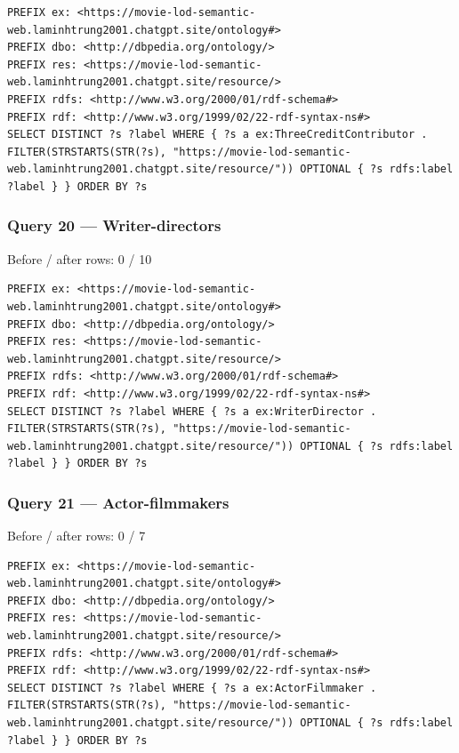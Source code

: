 \documentclass[
  11pt,
]{article}
\begin{document}
\begin{verbatim}
PREFIX ex: <https://movie-lod-semantic-web.laminhtrung2001.chatgpt.site/ontology#>
PREFIX dbo: <http://dbpedia.org/ontology/>
PREFIX res: <https://movie-lod-semantic-web.laminhtrung2001.chatgpt.site/resource/>
PREFIX rdfs: <http://www.w3.org/2000/01/rdf-schema#>
PREFIX rdf: <http://www.w3.org/1999/02/22-rdf-syntax-ns#>
SELECT DISTINCT ?s ?label WHERE { ?s a ex:ThreeCreditContributor . FILTER(STRSTARTS(STR(?s), "https://movie-lod-semantic-web.laminhtrung2001.chatgpt.site/resource/")) OPTIONAL { ?s rdfs:label ?label } } ORDER BY ?s
\end{verbatim}

\subsubsection{\texorpdfstring{Query 20 ---
Writer-\allowbreak{}d\allowbreak{}irectors\allowbreak{}}{Query 20 --- }}\label{query-20-writer-directors}

Before / after rows: 0 / 10

\begin{verbatim}
PREFIX ex: <https://movie-lod-semantic-web.laminhtrung2001.chatgpt.site/ontology#>
PREFIX dbo: <http://dbpedia.org/ontology/>
PREFIX res: <https://movie-lod-semantic-web.laminhtrung2001.chatgpt.site/resource/>
PREFIX rdfs: <http://www.w3.org/2000/01/rdf-schema#>
PREFIX rdf: <http://www.w3.org/1999/02/22-rdf-syntax-ns#>
SELECT DISTINCT ?s ?label WHERE { ?s a ex:WriterDirector . FILTER(STRSTARTS(STR(?s), "https://movie-lod-semantic-web.laminhtrung2001.chatgpt.site/resource/")) OPTIONAL { ?s rdfs:label ?label } } ORDER BY ?s
\end{verbatim}

\subsubsection{\texorpdfstring{Query 21 ---
Actor-\allowbreak{}fi\allowbreak{}lmmakers\allowbreak{}}{Query 21 --- }}\label{query-21-actor-filmmakers}

Before / after rows: 0 / 7

\begin{verbatim}
PREFIX ex: <https://movie-lod-semantic-web.laminhtrung2001.chatgpt.site/ontology#>
PREFIX dbo: <http://dbpedia.org/ontology/>
PREFIX res: <https://movie-lod-semantic-web.laminhtrung2001.chatgpt.site/resource/>
PREFIX rdfs: <http://www.w3.org/2000/01/rdf-schema#>
PREFIX rdf: <http://www.w3.org/1999/02/22-rdf-syntax-ns#>
SELECT DISTINCT ?s ?label WHERE { ?s a ex:ActorFilmmaker . FILTER(STRSTARTS(STR(?s), "https://movie-lod-semantic-web.laminhtrung2001.chatgpt.site/resource/")) OPTIONAL { ?s rdfs:label ?label } } ORDER BY ?s
\end{verbatim}
\end{document}
